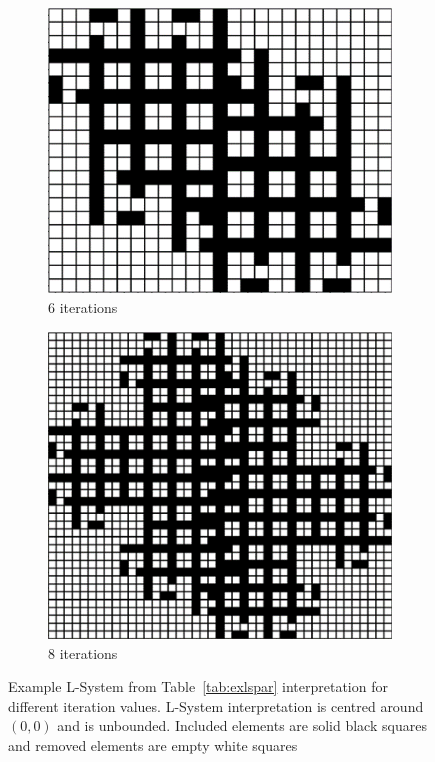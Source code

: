 \begin{figure}[ht]
\begin{subfigure}[t]{0.3\textwidth}
		\includegraphics[width=\textwidth]{si_ls_6.png}
		\caption{6 iterations}
	\end{subfigure}
	\hfill
	\begin{subfigure}[t]{0.3\textwidth}
		\centering
		\includegraphics[width=\textwidth]{si_ls_8.png}
		\caption{8 iterations}
	\end{subfigure}
	\caption[Example L-System interpretation for different iteration values]{Example L-System from Table~\ref{tab:exlspar} interpretation for different iteration values. L-System interpretation is centred around $\left (0,0  \right )$ and is unbounded. Included elements are solid black squares and removed elements are empty white squares}
	\label{fig:lsinti}
\end{figure}

